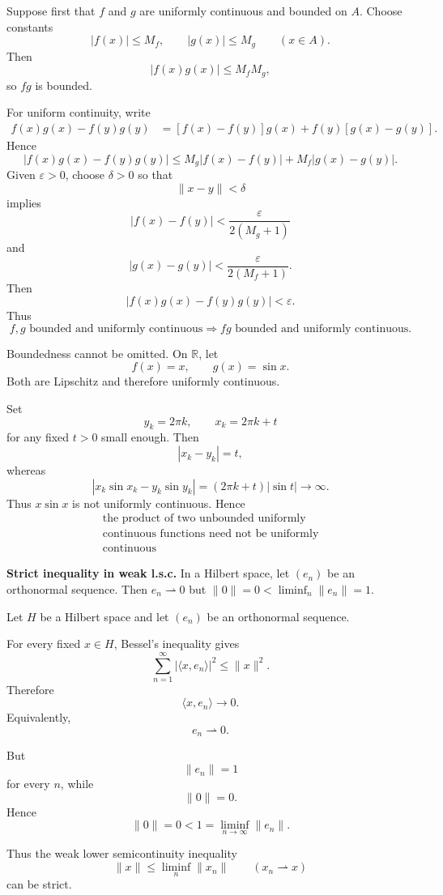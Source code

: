 \begin{solution}
Suppose first that \(f\) and \(g\) are uniformly continuous and bounded on \(A\). Choose
constants
\[
|f(x)|\le M_f,\qquad |g(x)|\le M_g
\qquad(x\in A).
\]
Then
\[
|f(x)g(x)|\le M_fM_g,
\]
so \(fg\) is bounded.

For uniform continuity, write
\[
\begin{aligned}
f(x)g(x)-f(y)g(y)
&=
[f(x)-f(y)]g(x)
+
f(y)[g(x)-g(y)].
\end{aligned}
\]
Hence
\[
|f(x)g(x)-f(y)g(y)|
\le
M_g|f(x)-f(y)|
+
M_f|g(x)-g(y)|.
\]
Given \(\varepsilon>0\), choose \(\delta>0\) so that
\[
\|x-y\|<\delta
\]
implies
\[
|f(x)-f(y)|
<
\frac{\varepsilon}{2(M_g+1)}
\]
and
\[
|g(x)-g(y)|
<
\frac{\varepsilon}{2(M_f+1)}.
\]
Then
\[
|f(x)g(x)-f(y)g(y)|<\varepsilon.
\]
Thus
\[
\boxed{
f,g\text{ bounded and uniformly continuous}
\Longrightarrow
fg\text{ bounded and uniformly continuous}.
}
\]

Boundedness cannot be omitted. On \(\mathbb R\), let
\[
f(x)=x,\qquad g(x)=\sin x.
\]
Both are Lipschitz and therefore uniformly continuous.

Set
\[
y_k=2\pi k,\qquad
x_k=2\pi k+t
\]
for any fixed \(t>0\) small enough. Then
\[
|x_k-y_k|=t,
\]
whereas
\[
|x_k\sin x_k-y_k\sin y_k|
=
(2\pi k+t)|\sin t|
\to\infty.
\]
Thus \(x\sin x\) is not uniformly continuous. Hence
\[
\boxed{\begin{gathered}
\text{the product of two unbounded uniformly}
\\
\text{continuous functions need not be uniformly}
\\
\text{continuous}
\end{gathered}}
\]
\end{solution}


\begin{problem}[CP-II-0095]
\label{prob:cp-ii-0095}
\textbf{Strict inequality in weak l.s.c.} In a Hilbert space,
		let $(e_n)$ be an orthonormal sequence. Then $e_n\rightharpoonup 0$ but
		$\|0\|=0<\liminf_n\|e_n\|=1$.
\end{problem}

\begin{solution}
Let \(H\) be a Hilbert space and let \((e_n)\) be an orthonormal sequence.

For every fixed \(x\in H\), Bessel's inequality gives
\[
\sum_{n=1}^{\infty}
|\langle x,e_n\rangle|^2
\le
\|x\|^2.
\]
Therefore
\[
\langle x,e_n\rangle\to0.
\]
Equivalently,
\[
\boxed{e_n\rightharpoonup0.}
\]

But
\[
\|e_n\|=1
\]
for every \(n\), while
\[
\|0\|=0.
\]
Hence
\[
\boxed{
\|0\|
=
0
<
1
=
\liminf_{n\to\infty}\|e_n\|.
}
\]

Thus the weak lower semicontinuity inequality
\[
\|x\|
\le
\liminf_n\|x_n\|
\qquad
(x_n\rightharpoonup x)
\]
can be strict.
\end{solution}


